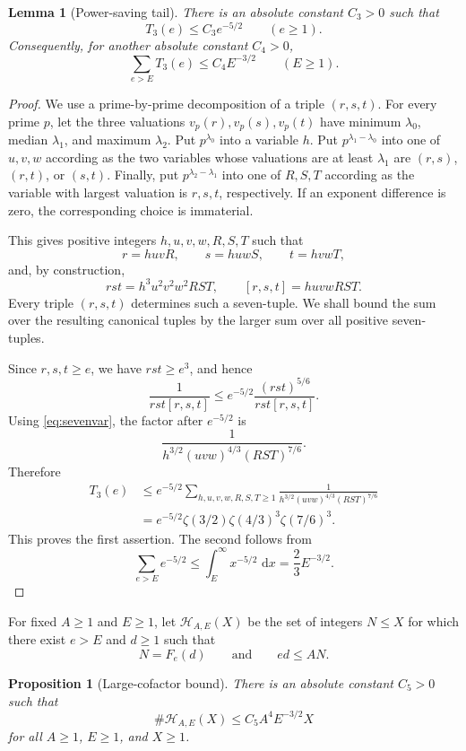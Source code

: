 \documentclass[11pt]{article}
\newtheorem{proposition}[theorem]{Proposition}
\newtheorem{lemma}[theorem]{Lemma}
\theoremstyle{definition}
\theoremstyle{remark}
\newcommand{\dd}{\,\mathrm d}
\begin{document}
\begin{lemma}[Power-saving tail]\label{lem:T3-tail}
There is an absolute constant $C_3>0$ such that
\[
T_3(e)\leq C_3e^{-5/2}
\qquad(e\geq1).
\]
Consequently, for another absolute constant $C_4>0$,
\[
\sum_{e>E}T_3(e)\leq C_4E^{-3/2}
\qquad(E\geq1).
\]
\end{lemma}

\begin{proof}
We use a prime-by-prime decomposition of a triple $(r,s,t)$.  For every prime $p$, let the three valuations $v_p(r),v_p(s),v_p(t)$ have minimum $\lambda_0$, median $\lambda_1$, and maximum $\lambda_2$.  Put $p^{\lambda_0}$ into a variable $h$.  Put $p^{\lambda_1-\lambda_0}$ into one of $u,v,w$ according as the two variables whose valuations are at least $\lambda_1$ are $(r,s)$, $(r,t)$, or $(s,t)$.  Finally, put $p^{\lambda_2-\lambda_1}$ into one of $R,S,T$ according as the variable with largest valuation is $r,s,t$, respectively.  If an exponent difference is zero, the corresponding choice is immaterial.

This gives positive integers $h,u,v,w,R,S,T$ such that
\[
r=huvR,
\qquad
s=huwS,
\qquad
t=hvwT,
\]
and, by construction,
\[
rst=h^3u^2v^2w^2RST,
\qquad
[r,s,t]=huvwRST. \tag{6.1}\label{eq:sevenvar}
\]
Every triple $(r,s,t)$ determines such a seven-tuple.  We shall bound the sum over the resulting canonical tuples by the larger sum over all positive seven-tuples.

Since $r,s,t\geq e$, we have $rst\geq e^3$, and hence
\[
\frac1{rst[r,s,t]}
\leq
e^{-5/2}\frac{(rst)^{5/6}}{rst[r,s,t]}.
\]
Using \eqref{eq:sevenvar}, the factor after $e^{-5/2}$ is
\[
\frac1{h^{3/2}(uvw)^{4/3}(RST)^{7/6}}.
\]
Therefore
\begin{align*}
T_3(e)
&\leq e^{-5/2}
\sum_{h,u,v,w,R,S,T\geq1}
\frac1{h^{3/2}(uvw)^{4/3}(RST)^{7/6}}\\
&=e^{-5/2}
\zeta(3/2)\zeta(4/3)^3\zeta(7/6)^3.
\end{align*}
This proves the first assertion.  The second follows from
\[
\sum_{e>E}e^{-5/2}\leq\int_E^\infty x^{-5/2}\,\dd x
=\frac23E^{-3/2}.
\]
\end{proof}

For fixed $A\geq1$ and $E\geq1$, let $\mathcal H_{A,E}(X)$ be the set of integers $N\leq X$ for which there exist $e>E$ and $d\geq1$ such that
\[
N=F_e(d)
\qquad\text{and}\qquad
ed\leq AN.
\]

\begin{proposition}[Large-cofactor bound]\label{prop:large-e}
There is an absolute constant $C_5>0$ such that
\[
\#\mathcal H_{A,E}(X)
\leq C_5A^4E^{-3/2}X
\]
for all $A\geq1$, $E\geq1$, and $X\geq1$.
\end{proposition}
\end{document}
